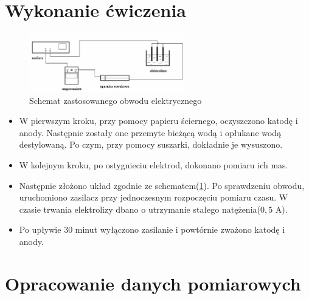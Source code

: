 \documentclass [a4paper,11pt]{article}
\begin{document}
	\section{Wykonanie ćwiczenia}
	\begin{figure}[!h]
		\centering
		\includegraphics[width=0.6\textwidth]{uklad}
		\caption{Schemat zastosowanego obwodu elektrycznego}
		\label{fig:uklad}
	\end{figure}
	\begin{itemize}
		\item W pierwszym kroku, przy pomocy papieru ściernego, oczyszczono katodę i anody. Następnie zostały one przemyte bieżącą wodą i opłukane wodą destylowaną. Po czym, przy pomocy suszarki, dokładnie je wysuszono.
		
		\item W kolejnym kroku, po ostygnieciu elektrod, dokonano pomiaru ich mas.
		
		\item Następnie złożono układ zgodnie ze schematem(\ref{fig:uklad}). Po sprawdzeniu obwodu, uruchomiono zasilacz przy jednoczesnym rozpoczęciu pomiaru czasu.
		W czasie trwania elektrolizy dbano o utrzymanie stałego natężenia($0,5$ A).
		
		\item  Po upływie 30 minut wyłączono zasilanie i powtórnie zważono katodę i anody.
	\end{itemize}

	
	\section{Opracowanie danych pomiarowych}\label{sec:opr}
\end{document}
